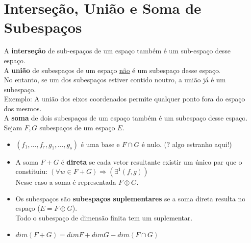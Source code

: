 \documentclass[]{report}
\begin{document}
\section{Interseção, União e Soma de Subespaços}
A \textbf{interseção} de sub-espaços de um espaço também é um sub-espaço desse espaço.\\[2mm]
A \textbf{união} de subespaços de um espaço \underline{não} é um subespaço desse espaço.\\
No entanto, se um dos subespaços estiver contido noutro, a união já é um subespaço.\\
Exemplo: A união dos eixos coordenados permite qualquer ponto fora do espaço dos mesmos.\\[2mm]
A \textbf{soma} de dois subespaços de um espaço também é um subespaço desse espaço.\\[2mm]
Sejam $F, G$ subespaços de um espaço $E$.
\begin{itemize}
\item $(f_1, \dots, f_r , g_1, \dots, g_s)$ é uma base e $F \cap G$ é nulo. (? algo estranho aqui!)
\item A soma $F+G$ é \textbf{direta} se cada vetor resultante existir um único par que o constituiu: $(\forall w \in F+G) \Rightarrow (\exists^1 (f, g))$\\
Nesse caso a soma é representada $F \oplus G$.
\item Os subespaços são \textbf{subespaços suplementares} se a soma direta resulta no espaço ($E = F \oplus G$).\\
Todo o subespaço de dimensão finita tem um suplementar.
\item $dim(F + G) = dim F + dim G - dim (F \cap G)$
\end{itemize}
\end{document}
